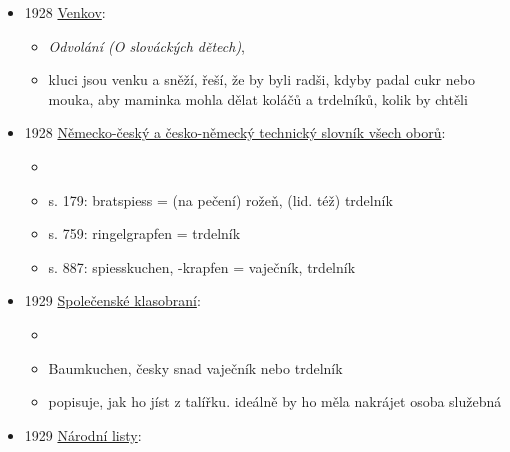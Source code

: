 \begin{itemize}
  \begin{itemize}
  \tightlist
  \item
    ráz života osady brněnského kraje před třicíti lety - Bosonohy jsou
    dneska část Brna
  \item
    dračky, draní peří, vzpomíná se na hody, masopusty, atd.
  \item
    po skončení draček se dělá důděrná, na kterou se napekly koblihy a
    trdelníky
  \end{itemize}
\item
  1928
  \href{https://ceskadigitalniknihovna.cz/uuid/uuid:25f83680-128e-11e8-8ee4-005056825209}{Venkov}:

  \begin{itemize}
  \tightlist
  \item
    \emph{Odvolání (O slováckých dětech)}, 
  \item
    kluci jsou venku a sněží, řeší, že by byli radši, kdyby padal cukr
    nebo mouka, aby maminka mohla dělat koláčů a trdelníků, kolik by
    chtěli
  \end{itemize}
\item
  1928
  \href{https://www.digitalniknihovna.cz/mzk/uuid/uuid:8e81eff0-e0cb-11e3-b110-005056827e51}{Německo-český
  a česko-německý technický slovník všech oborů}:

  \begin{itemize}
  \tightlist
  \item
  \item
    s. 179: bratspiess = (na pečení) rožeň, (lid. též) trdelník
  \item
    s. 759: ringelgrapfen = trdelník
  \item
    s. 887: spiesskuchen, -krapfen = vaječník, trdelník
  \end{itemize}
\item
  1929
  \href{https://ceskadigitalniknihovna.cz/view/uuid:8eac0a2b-3229-4774-bc7b-59842402b9e4?page=uuid\%3Abd127f65-068f-11ee-8565-00155d01210b&source=svkhk}{Společenské
  klasobraní}:

  \begin{itemize}
  \tightlist
  \item
  \item
    Baumkuchen, česky snad vaječník nebo trdelník
  \item
    popisuje, jak ho jíst z talířku. ideálně by ho měla nakrájet osoba
    služebná
  \end{itemize}
\item
  1929
  \href{https://ceskadigitalniknihovna.cz/view/uuid:bf47407e-435d-11dd-b505-00145e5790ea?page=uuid\%3A2a4bcb83-435e-11dd-b505-00145e5790ea&fulltext=trdeln\%C3\%ADk\%20OR\%20trdeln\%C3\%ADky\%20OR\%20trdeln\%C3\%ADk\%C5\%AF&source=mzk}{Národní
  listy}:


\end{itemize}
